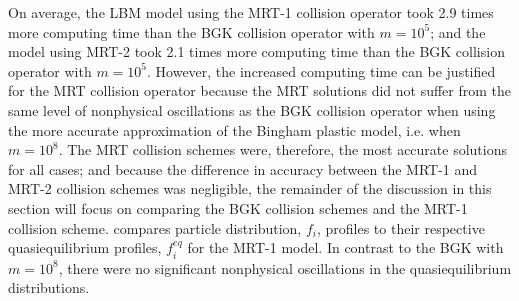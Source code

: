 On average, the LBM model using the MRT-1 collision operator took 2.9 times more computing time than the BGK collision operator with $m = 10^5$; and the model using MRT-2 took 2.1 times more computing time than the BGK collision operator with $m = 10^5$.
\DIFaddbegin {}\DIFaddend However, the increased computing time can be justified for the MRT collision operator because the MRT solutions did not suffer from the same level of nonphysical oscillations as the BGK collision operator when using the more accurate approximation of the Bingham plastic model, i.e. when $m = 10^8$. 
The MRT collision schemes were, therefore, the most accurate solutions for all cases; and because the difference in accuracy between the MRT-1 and MRT-2 collision schemes was negligible, the remainder of the discussion in this section will focus on comparing the BGK collision schemes and the MRT-1 collision scheme.
 compares particle distribution, $f_i$, profiles to their respective quasiequilibrium profiles, $f_i^{eq}$ for the MRT-1 model.
In contrast to the BGK with $m = 10^8$, there were no significant nonphysical oscillations in the quasiequilibrium distributions.


